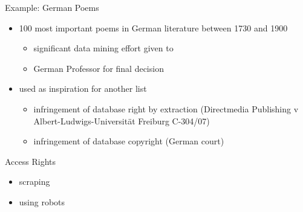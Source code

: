 \documentclass{beamer}
\begin{document}
\begin{frame}{Example: German Poems}
  \begin{itemize}
  \item 100 most important poems in German literature between
1730 and 1900
\begin{itemize}
\item significant data mining effort given to
\item German Professor for final decision
\end{itemize}
\item used as inspiration for another list
  \begin{itemize}
  \item infringement of database right by extraction (Directmedia Publishing v
  Albert-Ludwigs-Universität Freiburg C-304/07)
\item infringement of database copyright (German court)
  \end{itemize}
  \end{itemize}
\end{frame}

\begin{frame}{Access Rights}
  \begin{itemize}
  \item scraping
  \item using robots
  \end{itemize}
\end{frame}
\end{document}
